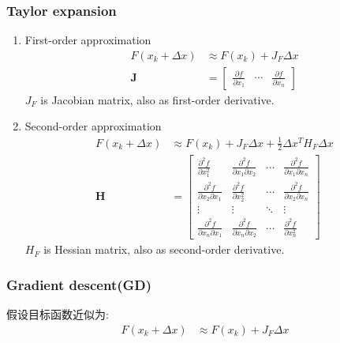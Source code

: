    \subsubsection{Taylor expansion}
    \begin{enumerate}
        \item First-order approximation
        \begin{align*}
            F(x_k+\Delta x) &\approx F(x_k)+J_F\Delta x\\
            \mathbf{J}&=\begin{bmatrix}
                \frac{\partial f}{\partial x_1} &\cdots &\frac{\partial f}{\partial x_n}
            \end{bmatrix}
        \end{align*}
        $J_F$ is Jacobian matrix, also as first-order derivative.
        \item Second-order approximation
        \begin{align*}
            F(x_k+\Delta x) &\approx F(x_k)+J_F\Delta x+\frac{1}{2}\Delta x^T H_F \Delta x\\
            \mathbf{H}&=\begin{bmatrix}
                \frac{\partial^{2} f}{\partial x_{1}^{2}} & \frac{\partial^{2} f}{\partial x_{1} \partial x_{2}} & \cdots & \frac{\partial^{2} f}{\partial x_{1} \partial x_{n}} \\
                \frac{\partial^{2} f}{\partial x_{2} \partial x_{1}} & \frac{\partial^{2} f}{\partial x_{2}^{2}} & \cdots & \frac{\partial^{2} f}{\partial x_{2} \partial x_{n}} \\
                \vdots & \vdots & \ddots & \vdots \\
                \frac{\partial^{2} f}{\partial x_{n} \partial x_{1}} & \frac{\partial^{2} f}{\partial x_{n} \partial x_{2}} & \cdots & \frac{\partial^{2} f}{\partial x_{n}^{2}}
                \end{bmatrix}
        \end{align*}
        $H_F$ is Hessian matrix, also as second-order derivative.
    \end{enumerate}

    \subsubsection{Gradient descent(GD)}
        
    假设目标函数近似为:
    \begin{align*}
        F(x_k+\Delta x) &\approx F(x_k)+J_F\Delta x
    \end{align*}

